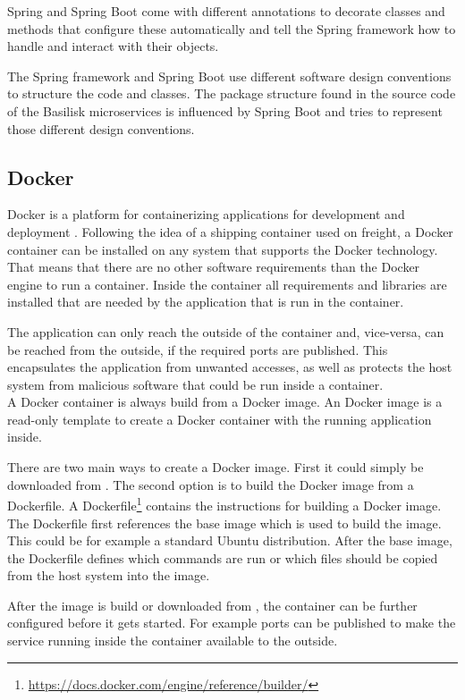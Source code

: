 Spring and Spring Boot come with different annotations to decorate classes and methods that configure these automatically and tell the Spring framework how to handle and interact with their objects.

The Spring framework and Spring Boot use different software design conventions to structure the code and classes.
The package structure found in the source code of the Basilisk microservices is influenced by Spring Boot and tries to represent those different design conventions.


\subsection{Docker}
Docker is a platform for containerizing applications for development and deployment \cite{DockerOverviewHttps2022}.
Following the idea of a shipping container used on freight, a Docker container can be installed on any system that supports the Docker technology.
That means that there are no other software requirements than the Docker engine to run a container.
Inside the container all requirements and libraries are installed that are needed by the application that is run in the container.

The application can only reach the outside of the container and, vice-versa, can be reached from the outside, if the required ports are published.
This encapsulates the application from unwanted accesses, as well as protects the host system from malicious software that could be run inside a container.
\\

A Docker container is always build from a Docker image.
An Docker image is a read-only template to create a Docker container with the running application inside.

There are two main ways to create a Docker image.
First it could simply be downloaded from \dockh{}.
The second option is to build the Docker image from a Dockerfile.
A Dockerfile\footnote{\url{https://docs.docker.com/engine/reference/builder/}} contains the instructions for building a Docker image.
The Dockerfile first references the base image which is used to build the image.
This could be for example a standard Ubuntu distribution.
After the base image, the Dockerfile defines which commands are run or which files should be copied from the host system into the image.

After the image is build or downloaded from \dockh{}, the container can be further configured before it gets started.
For example ports can be published to make the service running inside the container available to the outside.
\\

